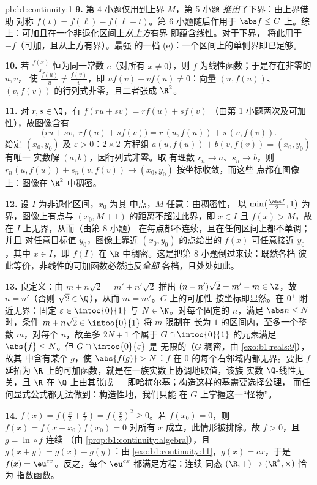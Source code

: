 \begin{solution}{pb:b1:continuity:1}
\textbf{9.} 第 4 小题仅用到上界 $M$，第 5 小题
\emph{推出}了下界：由上界借助
对称 $f(t) = f(\ell) - f(\ell - t)$。第 6 小题随后作用于
$\abs f \leq C$ 上。综上：可加且在一个非退化区间上\emph{从上方}有界
即蕴含线性。对于下界，
将此用于 $-f$（可加，且从上方有界）。最强
的一档 (e)：一个区间上的单侧界即已足够。

\textbf{10.} 若 $\frac{f(x)}{x}$ 恒为同一常数 $c$（对所有
$x \neq 0$），则 $f$ 为线性函数；于是存在非零的 $u, v$，
使 $\frac{f(u)}u \neq \frac{f(v)}v$，即 $u f(v) - v f(u)
\neq 0$：向量 $(u, f(u))$、$(v,
f(v))$ 的行列式非零，且二者张成 $\R^2$。

\textbf{11.} 对 $r, s \in \Q$，有 $f(ru + sv) = r f(u) + s f(v)$
（由第 1 小题两次及可加性），故图像含有
\[
\bigl(ru + sv,\; r f(u) + s f(v)\bigr)
= r\,(u, f(u)) + s\,(v, f(v)) .
\]
给定 $(x_0, y_0)$ 及 $\varepsilon > 0$：$2 \times 2$
方程组 $a(u, f(u)) + b(v, f(v)) = (x_0, y_0)$ 有唯一
实数解 $(a, b)$，因行列式非零。取
有理数 $r_n \to a$、$s_n \to b$，则 $r_n(u, f(u)) +
s_n(v, f(v)) \to (x_0, y_0)$ 按坐标收敛，而这些
点都在图像上：图像在 $\R^2$ 中稠密。

\textbf{12.} 设 $I$ 为非退化区间，$x_0$ 为其
中点，$M$ 任意：由稠密性，
以 $\min\bigl(\frac{\abs I}{2}, 1\bigr)$ 为界，图像上有点与 $(x_0, M + 1)$ 的距离不超过此界，即
$x \in I$ 且 $f(x) > M$，故在 $I$ 上无界，从而（由第 8 小题）
在每点都不连续，且在任何区间上都不单调；并且
对任意目标值 $y_0$，图像上靠近 $(x_0, y_0)$ 的点给出的 $f(x)$
可任意接近 $y_0$，其中 $x \in I$，即 $f(I)$ 在
$\R$ 中稠密。这是把第 8 小题倒过来读：既然各档
彼此等价，非线性的可加函数必然违反\emph{全部}
各档，且处处如此。

\textbf{13.} 良定义：由 $m + n\sqrt2 = m' + n'\sqrt2$ 推出
$(n - n')\sqrt2 = m' - m \in \Z$，故 $n = n'$（否则 $\sqrt2 \in
\Q$），从而 $m = m'$。$G$ 上的可加性
按坐标即显然。在 $0^+$ 附近无界：固定 $\varepsilon \in
\intoo{0}{1}$ 与 $N \in \N$。对每个固定的 $n$，满足 $\abs n
\leq N$ 时，条件 $m + n\sqrt2 \in \intoo{0}{1}$ 将 $m$ 限制在
长为 $1$ 的区间内，至多一个整数 $m$，对每个
$n$，故至多 $2N + 1$ 个属于 $G \cap \intoo{0}{1}$ 的元素满足
$\abs{f} \leq N$。但 $G \cap \intoo{0}{\varepsilon}$ 是
无限的（$G$ 稠密，由 \cref{exo:b1:reals:9}），故其
中含有某个 $g$，使 $\abs{f(g)} > N$：$f$ 在
$0$ 的每个右邻域内都无界。要把 $f$ 延拓为
$\R$ 上的可加函数，就是在一族实数上协调地取值，该族
实数 $\Q$-线性无关，且 $\R$ 在 $\Q$ 上由其张成
--- 即哈梅尔基；构造这样的基需要选择公理，
而任何显式公式都无法做到：构造性地，我们只能
在 $G$ 上掌握这一“怪物”。

\textbf{14.} $f(x) = f(\frac x2 + \frac x2) = f(\frac x2)^2 \geq
0$。若 $f(x_0) = 0$，则 $f(x) = f(x - x_0)f(x_0) = 0$ 对所有
$x$ 成立，此情形被排除。故 $f > 0$，且 $g = \ln \circ f$ 连续
（由 \cref{prop:b1:continuity:algebra}），且 $g(x + y) = g(x) +
g(y)$：由 \cref{exo:b1:continuity:11}，$g(x) = cx$，于是 $f(x) =
\eu^{cx}$。反之，每个 $\eu^{cx}$ 都满足方程：连续
同态 $(\R, +) \to (\R^*, \times)$ 恰为
指数函数。


\end{solution}
